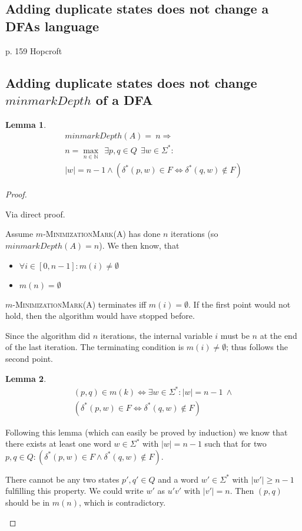 \documentclass[a4paper, oneside, 11pt]{report}
\newtheorem{lemma}{Lemma}
\theoremstyle{definition}
\theoremstyle{remark}
\newcommand{\MinMark}{\textsc{MinimizationMark}}
\begin{document}
\subsection{Adding duplicate states does not change a DFAs language}

p. 159 Hopcroft

\subsection{Adding duplicate states does not change $minmarkDepth$ of a DFA}

\begin{lemma}
	\begin{multline*}
	minmarkDepth(A) =\ n \Rightarrow \\
	n = \max_{n \in \mathbb{N}}\ \ \exists p, q \in Q\ \ \exists w \in \Sigma^* \colon \\
	|w| = n - 1 \land (\delta^*(p,w) \in F \Leftrightarrow \delta^*(q,w) \notin F)
	\end{multline*}
\end{lemma}

\begin{proof}
	\begin{description}
		\item
		
		Via direct proof.
		
		Assume $m$-\MinMark(A) has done $n$ iterations (so $minmarkDepth(A) = n$). We then know, that
		\begin{itemize}
			\item $\forall i \in [0,n-1]\colon m(i) \neq \emptyset$
			\item $m(n)= \emptyset$
		\end{itemize}
		$m$-\MinMark(A) terminates iff $m(i) = \emptyset$. If the first point would not hold, then the algorithm would have stopped before.
		
		Since the algorithm did $n$ iterations, the internal variable $i$ must be $n$ at the end of the last iteration. The terminating condition is $m(i) \neq \emptyset$; thus follows the second point.
		
		\begin{lemma}
			\begin{multline*}
			(p,q) \in m(k) \Longleftrightarrow 
			\exists w\in\Sigma^*\colon |w| = n - 1\ \land \\
			(\delta^*(p,w) \in F \Leftrightarrow \delta^*(q,w) \notin F)
			\end{multline*}
		\end{lemma}
		
		Following this lemma (which can easily be proved by induction) we know that there exists at least one word $w\in\Sigma^*$ with $|w| = n-1$ such that for two $p,q \in Q\colon (\delta^*(p,w) \in F \land \delta^*(q,w) \notin F)$.
		
		There cannot be any two states $p',q'\in Q$ and a word $w'\in\Sigma^*$ with $|w'| \ge n-1$ fulfilling this property. We could write $w'$ as $u'v'$ with $|v'| = n$. Then $(p,q)$ should be in $m(n)$, which is contradictory.
	\end{description}
\end{proof}
\end{document}
